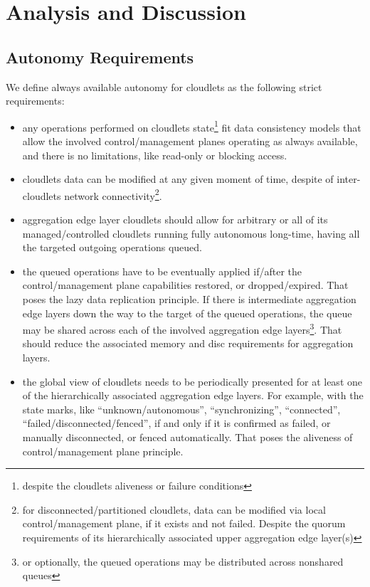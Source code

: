 \documentclass[conference]{IEEEtran}
\begin{document}
\section{Analysis and Discussion}

\subsection{Autonomy Requirements}

We define always available autonomy for cloudlets as the following strict
requirements:

\begin{itemize}
  \item any operations performed on cloudlets state\footnote{despite the
    cloudlets aliveness or failure conditions} fit data consistency models that
    allow the involved control/management planes operating as always available,
    and there is no limitations, like read-only or blocking access.
  \item cloudlets data can be modified at any given moment of time, despite of
    inter-cloudlets network connectivity\footnote{for disconnected/partitioned
    cloudlets, data can be modified via local control/management plane, if it
    exists and not failed. Despite the quorum requirements of its
    hierarchically associated upper aggregation edge layer(s)}.
  \item aggregation edge layer cloudlets should allow for arbitrary or all of
    its managed/controlled cloudlets running fully autonomous long-time, having
    all the targeted outgoing operations queued.
  \item the queued operations have to be eventually applied if/after the
    control/management plane capabilities restored, or dropped/expired. That
    poses the lazy data replication principle. If there is intermediate
    aggregation edge layers down the way to the target of the queued operations,
    the queue may be shared across each of the involved aggregation edge
    layers\footnote{or optionally, the queued operations may be distributed
    across nonshared queues}. That should reduce the associated memory and disc
    requirements for aggregation layers.
  \item the global view of cloudlets needs to be periodically presented for at
    least one of the hierarchically associated aggregation edge layers. For
    example, with the state marks, like ``unknown/autonomous'',
    ``synchronizing'', ``connected'', ``failed/disconnected/fenced'', if and
    only if it is confirmed as failed, or manually disconnected, or fenced
    automatically. That poses the aliveness of control/management plane
    principle.
\end{itemize}
\end{document}
